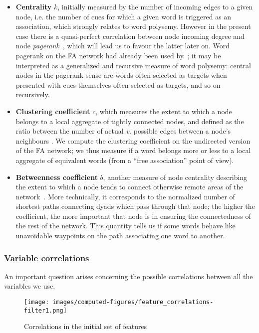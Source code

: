 \begin{itemize}
    \item \textbf{Centrality} $k$, initially measured by the number of incoming edges to a given node, i.e. the number of cues for which a given word is triggered as an association, which strongly relates to word polysemy.
    However in the present case there is a quasi-perfect correlation between node incoming degree and node \emph{pagerank}~\citep{Page99}, which will lead us to favour the latter later on. Word pagerank on the FA network had already been used by~\citet{Griffiths07}; it may be interpreted as a generalized and recursive measure of word polysemy: central nodes in the pagerank sense are words often selected as targets when presented with cues themselves often selected as targets, and so on recursively.
    \item \textbf{Clustering coefficient} $c$, which measures the extent to which a node belongs to a local aggregate of tightly connected nodes, and defined as the ratio between the number of actual \emph{v.} possible edges between a node's neighbours \cite{watt-coll}.
    We compute the clustering coefficient on the undirected version of the FA network; we thus measure if a word belongs more or less to a local aggregate of equivalent words (from a ``free association'' point of view).
    \item \textbf{Betweenness coefficient} $b$, another measure of node centrality describing the extent to which a node tends to connect otherwise remote areas of the network~\citep{free:set}.
    More technically, it corresponds to the normalized number of shortest paths connecting dyads which pass through that node; the higher the coefficient, the more important that node is in ensuring the connectedness of the rest of the network.
    This quantity tells us if some words behave like unavoidable waypoints on the path associating one word to another.
\end{itemize}

\subsubsection{Variable correlations}

An important question arises concerning the possible correlations between all the variables we use.

\begin{figure}[!th]
    \centering
    \texttt{[image: images/computed-figures/feature\_correlations-filter1.png]}
    \caption{Correlations in the initial set of features  }
    \label{fig:feature-corrs-initial}
\end{figure}


